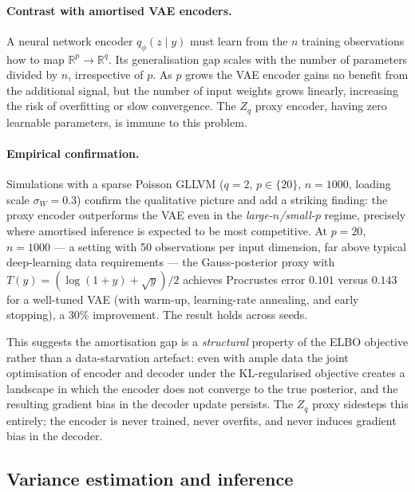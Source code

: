 \documentclass[twoside,11pt]{article}
\begin{document}
\paragraph{Contrast with amortised VAE encoders.}
A neural network encoder $q_\phi(z\mid y)$ must learn from the $n$ training observations how to map $\mathbb{R}^p \to \mathbb{R}^q$. Its generalisation gap scales with the number of parameters divided by $n$, irrespective of $p$. As $p$ grows the VAE encoder gains no benefit from the additional signal, but the number of input weights grows linearly, increasing the risk of overfitting or slow convergence. The $Z_q$ proxy encoder, having zero learnable parameters, is immune to this problem.

\paragraph{Empirical confirmation.}
Simulations with a sparse Poisson GLLVM ($q=2$, $p \in \{20\}$, $n=1000$, loading scale $\sigma_W = 0.3$) confirm the qualitative picture and add a striking finding: the proxy encoder outperforms the VAE even in the \emph{large-$n$/small-$p$} regime, precisely where amortised inference is expected to be most competitive.
At $p=20$, $n=1000$ --- a setting with 50 observations per input dimension, far above typical deep-learning data requirements --- the Gauss-posterior proxy with $T(y) = (\log(1+y)+\sqrt{y})/2$ achieves Procrustes error $0.101$ versus $0.143$ for a well-tuned VAE (with warm-up, learning-rate annealing, and early stopping), a 30\% improvement.
The result holds across seeds.

This suggests the amortisation gap is a \emph{structural} property of the ELBO objective rather than a data-starvation artefact: even with ample data the joint optimisation of encoder and decoder under the KL-regularised objective creates a landscape in which the encoder does not converge to the true posterior, and the resulting gradient bias in the decoder update persists.
The $Z_q$ proxy sidesteps this entirely; the encoder is never trained, never overfits, and never induces gradient bias in the decoder.


\subsection{Variance estimation and inference}
\label{sec:variance}
\end{document}
